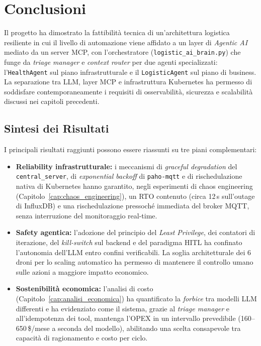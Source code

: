 
\chapter{Conclusioni}
\label{cap:conclusioni}

Il progetto ha dimostrato la fattibilità tecnica di un'architettura logistica resiliente in cui il livello di automazione viene affidato a un layer di \textit{Agentic AI} mediato da un server MCP, con l'orchestratore (\texttt{logistic\_ai\_brain.py}) che funge da \textit{triage manager} e \textit{context router} per due agenti specializzati: l'\texttt{HealthAgent} sul piano infrastrutturale e il \texttt{LogisticAgent} sul piano di business. La separazione tra LLM, layer MCP e infrastruttura Kubernetes ha permesso di soddisfare contemporaneamente i requisiti di osservabilità, sicurezza e scalabilità discussi nei capitoli precedenti.

\section{Sintesi dei Risultati}
\label{sec:sintesi_risultati}

I principali risultati raggiunti possono essere riassunti su tre piani complementari:

\begin{itemize}
    \item \textbf{Reliability infrastrutturale:} i meccanismi di \textit{graceful degradation} del \texttt{central\_server}, di \textit{exponential backoff} di \texttt{paho-mqtt} e di rischedulazione nativa di Kubernetes hanno garantito, negli esperimenti di chaos engineering (Capitolo~\ref{cap:chaos_engineering}), un RTO contenuto (circa 12\,s sull'outage di InfluxDB) e una rischedulazione pressoché immediata del broker MQTT, senza interruzione del monitoraggio real-time.
    \item \textbf{Safety agentica:} l'adozione del principio del \textit{Least Privilege}, dei contatori di iterazione, del \textit{kill-switch} sul backend e del paradigma HITL ha confinato l'autonomia dell'LLM entro confini verificabili. La soglia architetturale dei 6 droni per lo scaling automatico ha permesso di mantenere il controllo umano sulle azioni a maggiore impatto economico.
    \item \textbf{Sostenibilità economica:} l'analisi di costo (Capitolo~\ref{cap:analisi_economica}) ha quantificato la \emph{forbice} tra modelli LLM differenti e ha evidenziato come il sistema, grazie al \textit{triage manager} e all'idempotenza dei tool, mantenga l'OPEX in un intervallo prevedibile (160--650\,\$/mese a seconda del modello), abilitando una scelta consapevole tra capacità di ragionamento e costo per ciclo.
\end{itemize}

